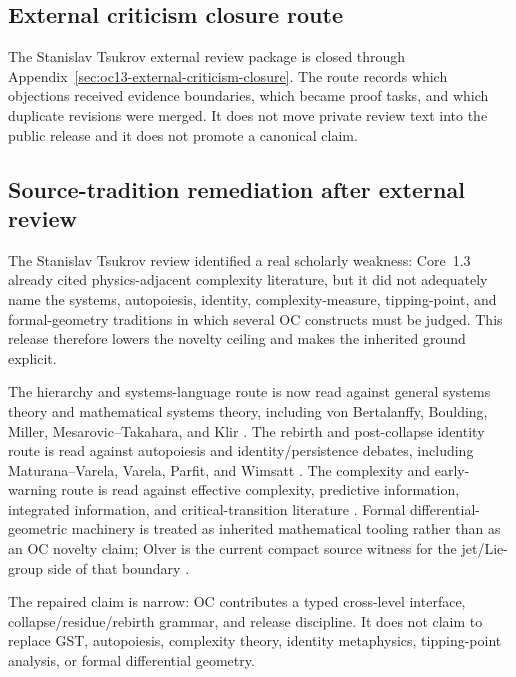 \clearpage

\subsection{External criticism closure route}
\label{sec:oc13-source-audit-external-criticism-closure}

The Stanislav Tsukrov external review package is closed through Appendix~\ref{sec:oc13-external-criticism-closure}. The route records which objections received evidence boundaries, which became proof tasks, and which duplicate revisions were merged. It does not move private review text into the public release and it does not promote a canonical claim.


\subsection{Source-tradition remediation after external review}
\label{sec:oc13-source-tradition-remediation-v3}

The Stanislav Tsukrov review identified a real scholarly weakness: Core~1.3
already cited physics-adjacent complexity literature, but it did not adequately
name the systems, autopoiesis, identity, complexity-measure, tipping-point, and
formal-geometry traditions in which several OC constructs must be judged. This
release therefore lowers the novelty ceiling and makes the inherited ground
explicit.

The hierarchy and systems-language route is now read against general systems
theory and mathematical systems theory, including von Bertalanffy,
Boulding, Miller, Mesarovic--Takahara, and Klir
\cite{bertalanffy_general_system_theory,boulding_general_systems_theory,miller_living_systems,mesarovic_takahara_general_systems,klir_architecture_systems}.
The rebirth and post-collapse identity route is read against autopoiesis and
identity/persistence debates, including Maturana--Varela, Varela, Parfit, and
Wimsatt \cite{maturana_varela_autopoiesis,varela_biological_autonomy,parfit_reasons_persons,wimsatt_reductionism_levels}.
The complexity and early-warning route is read against effective complexity,
predictive information, integrated information, and critical-transition
literature \cite{gell_mann_effective_complexity,bialek_predictability_complexity,tononi_information_integration,scheffer_critical_transitions,dakos_early_warning}.
Formal differential-geometric machinery is treated as inherited mathematical
tooling rather than as an OC novelty claim; Olver is the current compact source
witness for the jet/Lie-group side of that boundary \cite{olver_lie_groups}.

The repaired claim is narrow: OC contributes a typed cross-level interface,
collapse/residue/rebirth grammar, and release discipline. It does not claim to
replace GST, autopoiesis, complexity theory, identity metaphysics, tipping-point
analysis, or formal differential geometry.
